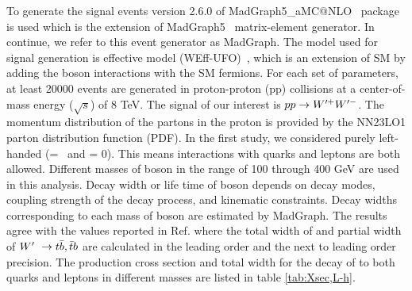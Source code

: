 To generate the signal events version 2.6.0 of   MadGraph5\_aMC@NLO~\cite{Alwall:2014hca} package is used which is the extension of MadGraph5~\cite{Alwall:2011uj} matrix-element generator. In continue, we refer to this event generator  as MadGraph.
The model used for signal generation is \wprime effective model (WEff-UFO)~\cite{Sullivan:2002jt}, which  is an extension of SM by adding the \wprime boson interactions with the SM fermions.
For each set of parameters, at least 20000 events are generated in proton-proton (pp) collisions at a center-of-mass energy ($\sqrt{s}$) of 8 TeV. The signal of our interest is $ pp\rightarrow W^{\prime+} W^{\prime-}$. The momentum distribution of the partons in the proton is provided by the NN23LO1 \cite{Ball:2013hta} parton distribution function (PDF).
In the first study, we considered purely left-handed  \wprime (\gL = \gSM ~and \gR  = 0). 
This means interactions with quarks and leptons are both allowed. Different masses of  \wprime boson in the range of 100 through 400 GeV are used in this analysis.  
Decay width or life time of \wprime boson depends on decay modes, coupling strength of the decay process, and kinematic constraints. Decay widths corresponding to each mass of \wprime boson are estimated  by MadGraph. The results agree with the values reported in Ref.\cite{Sullivan:2002jt} where the total width of \wprime and partial width of $W^\prime~ \rightarrow t \bar{b},\bar{t}b $ are calculated in the leading order and the next to leading order precision.
The production cross section and total width for the decay of \wprime  to both quarks and leptons in different masses are listed in table \ref{tab:Xsec,L-h}. %

